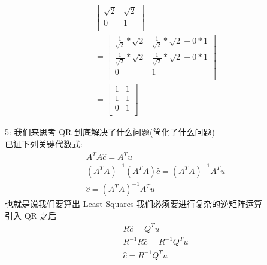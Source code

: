 \documentclass[12pt]{article}
\begin{document}
\begin{flushleft}
\begin{align}
\begin{bmatrix}
                          \sqrt{2} & \sqrt{2} \\
                          0        & 1        \\
                      \end{bmatrix}                                                                \\
        = \begin{bmatrix}
              \frac{1}{\sqrt{2}} * \sqrt{2} & \frac{1}{\sqrt{2}} * \sqrt{2} + 0 * 1 \\
              \frac{1}{\sqrt{2}} * \sqrt{2} & \frac{1}{\sqrt{2}} * \sqrt{2} + 0 * 1 \\
              0                             & 1                                     \\
          \end{bmatrix} \\
        = \begin{bmatrix}
              1 & 1 \\
              1 & 1 \\
              0 & 1 \\
          \end{bmatrix}
    \end{align}

    5: 我们来思考 QR 到底解决了什么问题(简化了什么问题) \\
    已证下列关键代数式: \\
    \begin{align}
        A^{T}A\hat{c} = A^{T}u                             \\
        (A^{T}A)^{-1}(A^{T}A)\hat{c} = (A^{T}A)^{-1}A^{T}u \\
        \hat{c} = (A^{T}A)^{-1}A^{T}u
    \end{align}
    也就是说我们要算出 Least-Squares 我们必须要进行复杂的逆矩阵运算 \\
    引入 QR 之后 \\
    \begin{align}
        R\hat{c} = Q^{T}u             \\
        R^{-1}R\hat{c} = R^{-1}Q^{T}u \\
        \hat{c} = R^{-1}Q^{T}u
    \end{align}



\end{flushleft}
\end{document}
